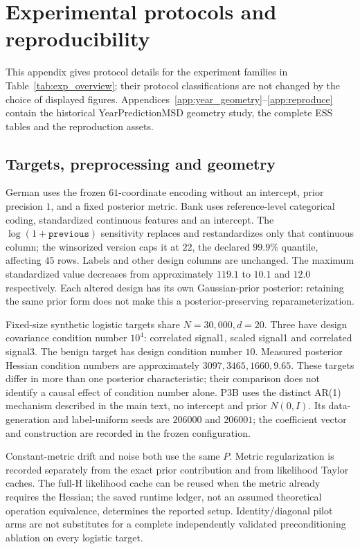 \section{Experimental protocols and reproducibility}\label{app:protocols}
This appendix gives protocol details for the experiment families in Table~\ref{tab:exp_overview}; their protocol classifications are not changed by the choice of displayed figures. Appendices~\ref{app:year_geometry}--\ref{app:reproduce} contain the historical YearPredictionMSD geometry study, the complete ESS tables and the reproduction assets.

\subsection{Targets, preprocessing and geometry}
German uses the frozen $61$-coordinate encoding without an intercept, prior precision $1$, and a fixed posterior metric. Bank uses reference-level categorical coding, standardized continuous features and an intercept. The $\log(1+\texttt{previous})$ sensitivity replaces and restandardizes only that continuous column; the winsorized version caps it at $22$, the declared $99.9\%$ quantile, affecting $45$ rows. Labels and other design columns are unchanged. The maximum standardized value decreases from approximately $119.1$ to $10.1$ and $12.0$ respectively. Each altered design has its own Gaussian-prior posterior: retaining the same prior form does not make this a posterior-preserving reparameterization.

Fixed-size synthetic logistic targets share $N=30{,}000,d=20$. Three have design covariance condition number $10^4$: correlated signal1, scaled signal1 and correlated signal3. The benign target has design condition number $10$. Measured posterior Hessian condition numbers are approximately $3097,3465,1660,9.65$. These targets differ in more than one posterior characteristic; their comparison does not identify a causal effect of condition number alone. P3B uses the distinct AR(1) mechanism described in the main text, no intercept and prior $N(0,I)$. Its data-generation and label-uniform seeds are $206000$ and $206001$; the coefficient vector and construction are recorded in the frozen configuration.

Constant-metric drift and noise both use the same $P$. Metric regularization is recorded separately from the exact prior contribution and from likelihood Taylor caches. The full-H likelihood cache can be reused when the metric already requires the Hessian; the saved runtime ledger, not an assumed theoretical operation equivalence, determines the reported setup. Identity/diagonal pilot arms are not substitutes for a complete independently validated preconditioning ablation on every logistic target.

